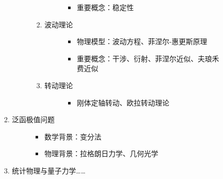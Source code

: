 \documentclass[a4paper,10pt,english]{sphinxmanual}
\begin{document}
\begin{itemize}
\begin{description}
\begin{enumerate}
\begin{description}
\begin{enumerate}
\begin{description}
\begin{itemize}
\item {} 
重要概念：稳定性

\end{itemize}

\end{description}

\item {} \begin{description}
\item[{波动理论}] \leavevmode\begin{itemize}
\item {} 
物理模型：波动方程、菲涅尔-惠更斯原理

\item {} 
重要概念：干涉、衍射、菲涅尔近似、夫琅禾费近似

\end{itemize}

\end{description}

\item {} \begin{description}
\item[{转动理论}] \leavevmode\begin{itemize}
\item {} 
刚体定轴转动、欧拉转动理论

\end{itemize}

\end{description}

\end{enumerate}

\end{description}

\item {} \begin{description}
\item[{泛函极值问题}] \leavevmode\begin{itemize}
\item {} 
数学背景：变分法

\item {} 
物理背景：拉格朗日力学、几何光学

\end{itemize}

\end{description}

\item {} 
统计物理与量子力学……

\end{enumerate}

\end{description}

\end{itemize}
\end{document}
